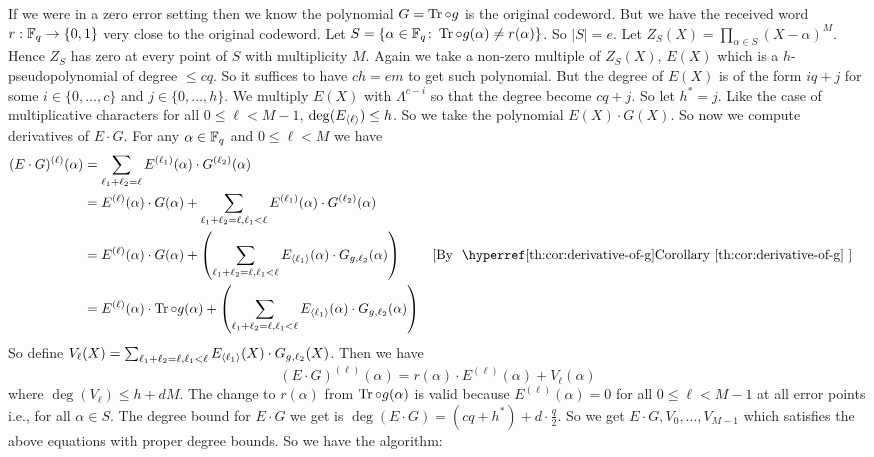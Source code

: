 If we were in a zero error setting then we know the polynomial $G=\operatorname{Tr}\circ g$ is the original codeword. But we have the received word $r:\mathbb{F}_q\to \{0,1\}$ very close to the original codeword. Let $S=\{\alpha\in\mathbb{F}_q\colon \operatorname{Tr}\circ g(\alpha)\neq r(\alpha)\}$. So $|S|=e$.  Let $Z_S(X)=\prod_{\alpha\in S}(X-\alpha)^M$. Hence $Z_S$ has zero at every point of $S$ with multiplicity $M$. Again we take a non-zero multiple of $Z_S(X)$, $E(X)$ which is a $h$-pseudopolynomial of degree $\leq cq$. So it suffices to have $ch=em$ to get such polynomial. But the degree of $E(X)$ is of the form $iq+j$ for some $i\in\{0,\dots, c\}$ and $j\in \{0,\dots, h\}$. We multiply $E(X)$ with $\Lambda^{c-i}$ so that the degree become $cq+j$. So let $h^*=j$. Like the case of multiplicative characters for all $0\leq \ell<M-1$, $\deg(E_{\langle \ell\rangle})\leq h$. So we take the polynomial $E(X)\cdot G(X)$. So now we compute derivatives of $E\cdot G$. For any $\alpha\in\mathbb{F}_q$ and $0\leq \ell<M$ we have \begin{align*}
  (E\cdot G)^{(\ell)}(\alpha) & = \sum_{\ell_1+\ell_2=\ell}E^{(\ell_1)}(\alpha)\cdot G^{(\ell_2)}(\alpha)                                                                                             \\
                              & = E^{(\ell)}(\alpha)\cdot G(\alpha)+\sum_{\ell_1+\ell_2=\ell, \ell_1<\ell}E^{(\ell_1)}(\alpha)\cdot G^{(\ell_2)}(\alpha)                                              \\
                              & = E^{(\ell)}(\alpha)\cdot G(\alpha) + \lt(\sum_{\ell_1+\ell_2=\ell, \ell_1<\ell}E_{\la\ell_1\ra}(\alpha)\cdot G_{g,\ell_2}(\alpha)\rt)        & \byc{derivative-of-g} \\
                              & = E^{(\ell)}(\alpha)\cdot \tr\circ g(\alpha)+\lt(\sum_{\ell_1+\ell_2=\ell, \ell_1<\ell}E_{\la\ell_1\ra}(\alpha)\cdot G_{g,\ell_2}(\alpha)\rt)
\end{align*}
So define $V_{\ell}(X)=\sum_{\ell_1+\ell_2=\ell, \ell_1<\ell}E_{\langle\ell_1\rangle}(X)\cdot G_{g,\ell_2}(X)$. Then we have $$(E\cdot G)^{(\ell)}(\alpha)=r(\alpha)\cdot E^{(\ell)}(\alpha)+V_{\ell}(\alpha)$$ where $\deg(V_{\ell})\leq h+dM$. The change to $r(\alpha)$ from $\operatorname{Tr}\circ g(\alpha)$ is valid because $E^{(\ell)}(\alpha)=0$ for all $0\leq \ell<M-1$ at all error points i.e., for all $\alpha\in S$. The degree bound for $E\cdot G$ we get is $\deg(E\cdot G)=(cq+h^*)+d\cdot \frac{q}2$. So we get $E\cdot G, V_0,\dots, V_{M-1}$ which satisfies the above equations with proper degree bounds. So we have the algorithm:

